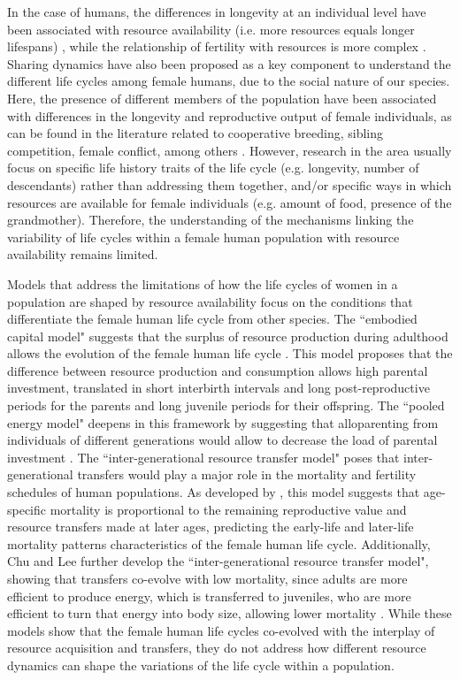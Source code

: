 \documentclass{article}
\begin{document}
In the case of humans, the differences in longevity at an individual level have been associated with resource availability (i.e. more resources equals longer lifespans) \citep{kaplan2003embodied}, while the relationship of fertility with resources is more complex \citep{mulder1998demographic,sear2016understanding}. Sharing dynamics have also been proposed as a key component to understand the different life cycles among female humans, due to the social nature of our species. Here, the presence of different members of the population have been associated with differences in the longevity and reproductive output of female individuals, as can be found in the literature related to cooperative breeding, sibling competition, female conflict, among others \citep{ivey2000cooperative,nitsch2013elder,mace2012female,sear2011much}. However, research in the area usually focus on specific life history traits of the life cycle (e.g. longevity, number of descendants) rather than addressing them together, and/or specific ways in which resources are available for female individuals (e.g. amount of food, presence of the grandmother). Therefore, the understanding of the mechanisms linking the variability of life cycles within a female human population with resource availability remains limited.

Models that address the limitations of how the life cycles of women in a population are shaped by resource availability focus on the conditions that differentiate the female human life cycle from other species. The ``embodied capital model" suggests that the surplus of resource production during adulthood allows the evolution of the female human life cycle \citep{kaplan2000theory}. This model proposes that the difference between resource production and consumption allows high parental investment, translated in short interbirth intervals and long post-reproductive periods for the parents and long juvenile periods for their offspring. The ``pooled energy model" deepens in this framework by suggesting that alloparenting from individuals of different generations would allow to decrease the load of parental investment \citep{kramer2010pooled}. The ``inter-generational resource transfer model" poses that inter-generational transfers would play a major role in the mortality and fertility schedules of human populations. As developed by \cite{lee2003rethinking}, this model suggests that age-specific mortality is proportional to the remaining reproductive value and resource transfers made at later ages, predicting the early-life and later-life mortality patterns characteristics of the female human life cycle. Additionally, Chu and Lee further develop the ``inter-generational resource transfer model", showing that transfers co-evolve with low mortality, since adults are more efficient to produce energy, which is transferred to juveniles, who are more efficient to turn that energy into body size, allowing lower mortality \citep{chu2006co}. While these models show that the female human life cycles co-evolved with the interplay of resource acquisition and transfers, they do not address how different resource dynamics can shape the variations of the life cycle within a population.
\end{document}
